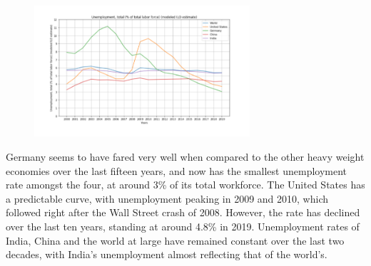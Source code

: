 \documentclass[conference]{IEEEtran}
\begin{document}
\begin{figure}[htp]
    \centering
    \includegraphics[width=8cm]{unemp.png}
    \label{fig:unEmp}
\end{figure}

Germany seems to have fared very well when compared to the other heavy weight economies over the last fifteen years, and now has the smallest unemployment rate amongst the four, at around 3\% of its total workforce. The United States has a predictable curve, with unemployment peaking in 2009 and 2010, which followed right after the Wall Street crash of 2008. However, the rate has declined over the last ten years, standing at around 4.8\% in 2019. Unemployment rates of India, China and the world at large have remained constant over the last two decades, with India’s unemployment almost reflecting that of the world’s.\\
\end{document}
